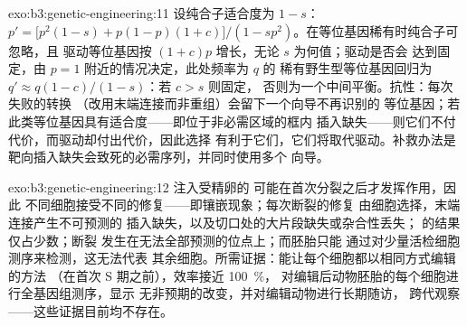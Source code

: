 \begin{solution}{exo:b3:genetic-engineering:11}
设纯合子适合度为 $1 - s$：$p' = \bigl[p^{2}(1-s) + p(1-p)(1+c)
\bigr]/(1 - sp^{2})$。在等位基因稀有时纯合子可忽略，且
驱动等位基因按 $(1+c)p$ 增长，无论 $s$ 为何值；驱动是否会
达到固定，由 $p = 1$ 附近的情况决定，此处频率为 $q$ 的
稀有野生型等位基因回归为 $q' \approx q(1-c)/(1-s)$：若 $c > s$ 则固定，
否则为一个中间平衡。抗性：每次失败的转换
（改用末端连接而非重组）会留下一个向导不再识别的
等位基因；若此类等位基因具有适合度——即位于非必需区域的框内
插入缺失——则它们不付代价，而驱动却付出代价，因此选择
有利于它们，它们将取代驱动。补救办法是
靶向插入缺失会致死的必需序列，并同时使用多个
向导。
\end{solution}

\begin{solution}{exo:b3:genetic-engineering:12}
注入受精卵的  可能在首次分裂之后才发挥作用，因此
不同细胞接受不同的修复——即镶嵌现象；每次断裂的修复
由细胞选择，末端连接产生不可预测的
插入缺失，以及切口处的大片段缺失或杂合性丢失；
的结果仅占少数；断裂
发生在无法全部预测的位点上；而胚胎只能
通过对少量活检细胞测序来检测，这无法代表
其余细胞。所需证据：能让每个细胞都以相同方式编辑的方法
（在首次 S 期之前），效率接近 \qty{100}{\%}，
对编辑后动物胚胎的每个细胞进行全基因组测序，显示
无非预期的改变，并对编辑动物进行长期随访，
跨代观察——这些证据目前均不存在。
\end{solution}

